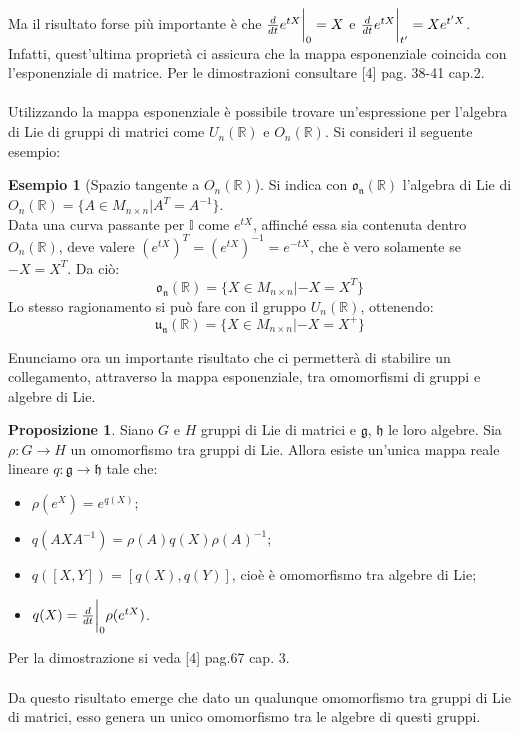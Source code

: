 \documentclass[12pt,a4paper]{report}
\theoremstyle{definition}
\theoremstyle{Theorem}
\newtheorem{Prop}[Def]{Proposizione}
\theoremstyle{definition}
\newtheorem{Ex}[Def]{Esempio}
\theoremstyle{definition}
\theoremstyle{definition}
\begin{document}
Ma il risultato forse più importante è che ${d\over dt}e^{tX}\bigg{\rvert}_0=X$ e ${d\over dt}e^{tX}\bigg{\rvert}_{t'}=Xe^{t'X}$.\\
Infatti, quest'ultima proprietà ci assicura che la mappa esponenziale coincida con l'esponenziale di matrice.
Per le dimostrazioni consultare [4] pag. 38-41 cap.2.\\
\\
Utilizzando la mappa esponenziale è possibile trovare un'espressione per l'algebra di Lie di gruppi di matrici come $U_n(\mathbb{R})$ e $O_n(\mathbb{R})$. Si consideri il seguente esempio:
\begin{Ex}[Spazio tangente a $O_n(\mathbb{R})$]
	Si indica con $\mathfrak{o_n(\mathbb{R})}$ l'algebra di Lie di $O_n(\mathbb{R})=\{A\in M_{n\times n}|A^T=A^{-1}\}$.\\
	Data una curva passante per $\mathbb{I}$ come $e^{tX}$, affinché essa sia contenuta dentro $O_n(\mathbb{R})$, deve valere $(e^{tX})^T=(e^{tX})^{-1}=e^{-tX}$, che è vero solamente se $-X=X^T$. Da ciò: $$\mathfrak{o_n(\mathbb{R})}=\{X\in M_{n\times n}|-X=X^T\}$$
	Lo stesso ragionamento si può fare con il gruppo $U_n(\mathbb{R})$, ottenendo: $$\mathfrak{u_n(\mathbb{R})}=\{X\in M_{n\times n}|-X=X^+\}$$
\end{Ex}
Enunciamo ora un importante risultato che ci permetterà di stabilire un collegamento, attraverso la mappa esponenziale, tra omomorfismi di gruppi e algebre di Lie.
\begin{Prop} \label{Prop: 2.4.1}
	Siano $G$ e $H$ gruppi di Lie di matrici e $\mathfrak{g}$, $\mathfrak{h}$ le loro algebre. Sia $\rho:G\rightarrow H$ un omomorfismo tra gruppi di Lie. Allora esiste un'unica mappa reale lineare $q:\mathfrak{g}\rightarrow\mathfrak{h}$ tale che:
	\begin{itemize}
		\item $\rho(e^X)=e^{q(X)}$; 
		\item $q(AXA^{-1})=\rho(A)q(X)\rho(A)^{-1}$;
		\item $q([X,Y])=[q(X),q(Y)]$, cioè è omomorfismo tra algebre di Lie;
		\item $q(X)={d\over dt}\bigg{\rvert}_0\rho(e^{tX})$.
	\end{itemize}
\end{Prop}
Per la dimostrazione si veda [4] pag.67 cap. 3.\\
\\
Da questo risultato emerge che dato un qualunque omomorfismo tra gruppi di Lie di matrici, esso genera un unico omomorfismo tra le algebre di questi gruppi.
\end{document}
